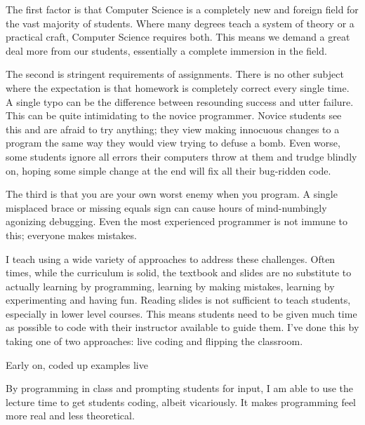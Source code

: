 \documentclass[a4paper]{article}
\begin{document}
The first factor is that Computer Science is a completely new and foreign field for the vast majority of students.
Where many degrees teach a system of theory or a practical craft, Computer Science requires both. 
This means we demand a great deal more from our students, essentially a complete immersion in the field.


The second is stringent requirements of assignments.
There is no other subject where the expectation is that homework is completely correct every single time.
A single typo can be the difference between resounding success and utter failure.
This can be quite intimidating to the novice programmer.
Novice students see this and are afraid to try anything; they view making innocuous changes to a program the same way they would view trying to defuse a bomb.
Even worse, some students ignore all errors their computers throw at them and trudge blindly on, hoping some simple change at the end will fix all their bug-ridden code.


The third is that you are your own worst enemy when you program.
A single misplaced brace or missing equals sign can cause hours of mind-numbingly agonizing debugging.
Even the %
most experienced programmer is not immune to this; everyone makes mistakes.



I teach using a wide variety of approaches to address these challenges.
Often times, while the curriculum is solid, the textbook and slides are no substitute to actually learning by programming, learning by making mistakes, learning by experimenting and having fun.
Reading slides is not sufficient to teach students, especially in lower level courses.
This means students need to be given much time as possible to code with their instructor available to guide them.
I've done this by taking one of two approaches: live coding and flipping the classroom.

Early on, coded up examples live 

By programming in class and prompting students for input, I am able to use the lecture time to get students coding, albeit vicariously.
It makes programming feel more real and less theoretical.
\end{document}
